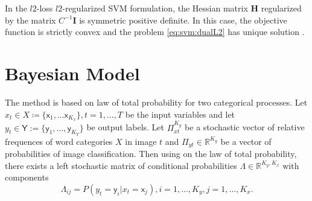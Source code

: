 \documentclass{aip-cp}
\begin{document}
In the $l2$-loss $l2$-regularized SVM formulation, the Hessian matrix $\boldsymbol{H}$ regularized by the matrix $C^{-1}\boldsymbol{I}$ is symmetric positive definite. In this case, the objective function is strictly convex and the problem \eqref{eq:svm:dualL2} has unique solution \cite{DosBOOK-2009}.

\section{Bayesian Model}

The method is based on law of total probability for two categorical processes. 
Let $x_t \in X \coloneqq \lbrace \mathsf{x}_1, \dots \mathsf{x}_{K_x} \rbrace, t = 1,\dots,T$ be the input variables and let $y_t \in \mathsf{Y} := \lbrace \mathsf{y}_1, \dots, \mathsf{y}_{K_Y} \rbrace$ be output labels.
Let $\Pi_{xt}^{K_y}$ be a stochastic vector of relative frequences of word categories $X$ in image $t$ and $\Pi_{yt} \in \mathbb{R}^{K_y}$ be a vector of probabilities of image classification. Then using on the law of total probability, there exists a left stochastic matrix of conditional probabilities $\Lambda \in \mathbb{R}^{K_y,K_x}$ with components
\begin{equation}
    \Lambda_{ij} = P(y_t = \mathsf{y}_i | x_t = \mathsf{x}_j), i = 1, \dots, K_y, j = 1, \dots, K_x.
\end{equation}

\end{document}
